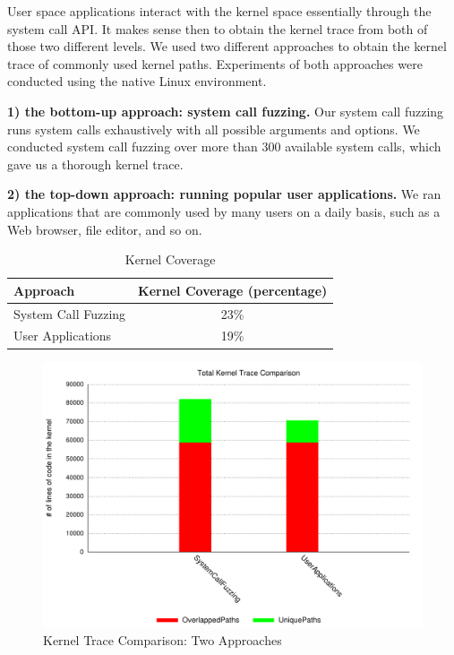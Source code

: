 User space applications interact with the kernel space essentially through the system call API. 
It makes sense then to obtain the kernel trace from both of those two different levels. 
We used two different approaches to obtain the kernel trace of commonly used kernel paths. 
Experiments of both approaches were conducted using the native Linux environment.

\textbf{1) the bottom-up approach: system call fuzzing.}
Our system call fuzzing runs system calls exhaustively with all possible 
arguments and options. We conducted system call fuzzing over more than 300 available system calls, 
which gave us a thorough kernel trace. 

\textbf{2) the top-down approach: running popular user applications.} 
We ran applications that are commonly used by many users on a daily basis, such as a Web browser, 
file editor, and so on.  

\begin{table}%
\centering
\scriptsize
\begin{tabular}{|l|c|}
  \hline
  \textbf{Approach} & \textbf{Kernel Coverage (percentage)} \\
  \hline \hline
  System Call Fuzzing & 23\% \\
  \hline
  User Applications & 19\% \\
  \hline
\end{tabular}
\caption {Kernel Coverage}
\label{table:kernel_coverage}
\end{table}

\begin{figure}%
\centering
\includegraphics[width=1.0\columnwidth]{diagram/lind_ccs15_diagram_01.pdf}
\caption{Kernel Trace Comparison: Two Approaches}
\label{fig:two_approaches_trace}
\end{figure}

